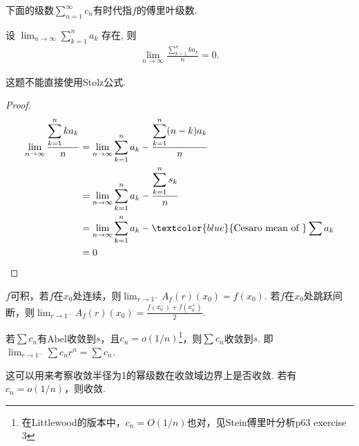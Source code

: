 \begin{note}
    下面的级数$\sum_{n=1}^{\infty}c_n$有时代指$f$的傅里叶级数.
\end{note}

\begin{corollary}
    设 $\lim _{n \rightarrow \infty} \sum_{k=1}^n a_k$ 存在, 则
    \begin{align*}
        \lim _{n \rightarrow \infty} \frac{\displaystyle\sum_{k=1}^n k a_k}{n}=0 .
    \end{align*}
\end{corollary}

\begin{note}
    这题不能直接使用Stolz公式.
\end{note}

\begin{proof}
    \begin{align*}
        \lim _{n \rightarrow \infty} \frac{\displaystyle\sum_{k=1}^n k a_k}{n}
         & =
        \lim _{n \rightarrow \infty} \sum_{k=1}^n a_k-\frac{\displaystyle\sum_{k=1}^n (n-k) a_k}{n}   \\
         & =
        \lim _{n \rightarrow \infty} \sum_{k=1}^n a_k-\frac{\displaystyle\sum_{k=1}^n s_k}{n}         \\
         & =
        \lim _{n \rightarrow \infty}\sum_{k=1}^n a_k-\textcolor{blue}{\text{Cesaro mean of }}\sum a_k \\
         & =0                                                                                         \\
    \end{align*}
\end{proof}


\begin{theorem}
    $f$可积，若$f$在$x_0$处连续，则$\lim_{r\to 1^-}A_f(r)(x_0)=f(x_0)$. 若$f$在$x_0$处跳跃间断，则$\lim_{r\to 1^-}A_f(r)(x_0)=\frac{f(x_0^-)+f(x_0^+)}{2}$.
\end{theorem}

\begin{theorem}
    若$\sum c_n$有Abel收敛到$s$，且$c_n=o(1/n)$\footnote{在Littlewood的版本中，$c_n=O(1/n)$也对，见Stein傅里叶分析p63 exercise 3}，则$\sum c_n$收敛到$s$. 即$\lim_{r\to 1^-}\sum c_nr^n=\sum c_n$.
\end{theorem}

\begin{note}
    这可以用来考察收敛半径为1的幂级数在收敛域边界上是否收敛. 若有$c_n=o(1/n)$，则收敛.
\end{note}

